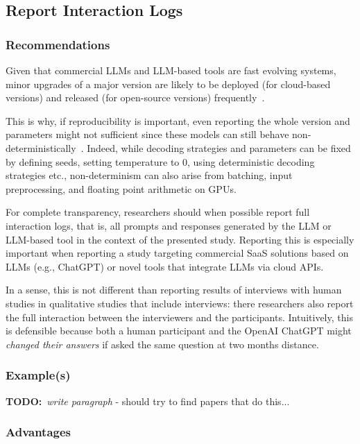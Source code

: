 \documentclass[11pt]{article}
\newcommand{\todo}[1]{{\textbf{TODO:}\ \textit{#1}}} %
\begin{document}
\subsection{Report Interaction Logs}

\subsubsection{Recommendations}

Given that commercial LLMs and LLM-based tools are fast evolving systems, minor upgrades of a major version are likely to be deployed (for cloud-based versions) and released (for open-source versions) frequently~\cite{DBLP:journals/corr/abs-2307-09009}. 

This is why, if reproducibility is important, even reporting the whole version and parameters might not sufficient since these models can still behave non-deterministically~\cite{Chann2023}. Indeed, while decoding strategies and parameters can be fixed by defining seeds, setting temperature to 0, using deterministic decoding strategies etc., non-determinism can also arise from batching, input preprocessing, and floating point arithmetic on GPUs.

For complete transparency, researchers should when possible report full interaction logs, that is, all prompts and responses generated by the LLM or LLM-based tool in the context of the presented study. 
Reporting this is especially important when reporting a study targeting commercial SaaS solutions based on LLMs (e.g., ChatGPT) or novel tools that integrate LLMs via cloud APIs.

In a sense, this is not different than reporting results of interviews with human studies in qualitative studies that include interviews: there researchers also report the full interaction between the interviewers and the participants. Intuitively, this is defensible because both a human participant and the OpenAI ChatGPT might {\em changed their answers} if asked the same question at two months distance.



\subsubsection{Example(s)}

\todo{write paragraph}
- should try to find papers that do this... 


\subsubsection{Advantages}
\end{document}
